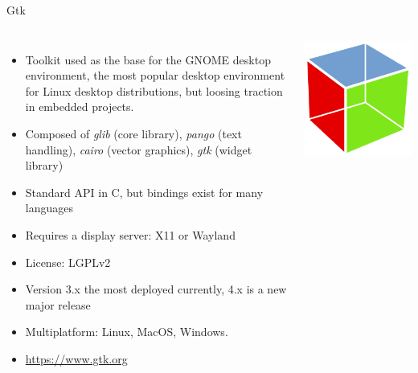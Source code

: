 \begin{frame}{Gtk}
  \begin{columns}
    \begin{itemize}
    \item Toolkit used as the base for the GNOME desktop environment,
      the most popular desktop environment for Linux desktop
      distributions, but loosing traction in embedded projects.
    \item Composed of {\em glib} (core library), {\em pango} (text
      handling), {\em cairo} (vector graphics), {\em gtk} (widget
      library)
    \item Standard API in C, but bindings exist for many languages
    \item Requires a display server: X11 or Wayland
    \item License: LGPLv2
    \item Version 3.x the most deployed currently, 4.x is a new major
      release
    \item Multiplatform: Linux, MacOS, Windows.
    \item \url{https://www.gtk.org}
    \end{itemize}
    \includegraphics[width=\textwidth]{slides/sysdev-software-stacks/gtk-logo.png}
  \end{columns}
\end{frame}

